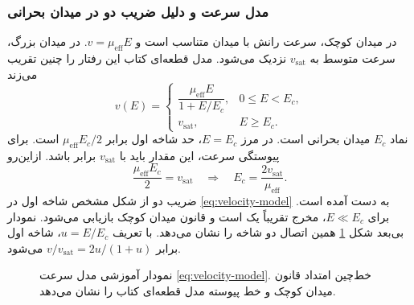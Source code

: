 \subsubsection*{مدل سرعت و دلیل ضریب دو در میدان بحرانی}
در میدان کوچک، سرعت رانش با میدان متناسب است و \(v=\mu_{\mathrm{eff}}E\).
در میدان بزرگ، سرعت متوسط به \(v_{\mathrm{sat}}\) نزدیک می‌شود. مدل قطعه‌ای
کتاب این رفتار را چنین تقریب می‌زند
\cite[روابط  و ]{weste}\cite[اسلاید ۹]{nonideal}
\begin{equation}
 v(E)=\begin{cases}
 \dfrac{\mu_{\mathrm{eff}}E}{1+E/E_c},&0\le E<E_c,\\[5pt]
 v_{\mathrm{sat}},&E\ge E_c.
 \end{cases}
 \label{eq:velocity-model}
\end{equation}
نماد \(E_c\) میدان بحرانی است. در مرز \(E=E_c\)، حد شاخه اول برابر
\(\mu_{\mathrm{eff}}E_c/2\) است. برای پیوستگی سرعت، این مقدار باید با
\(v_{\mathrm{sat}}\) برابر باشد. ازاین‌رو
\begin{equation}
 \frac{\mu_{\mathrm{eff}}E_c}{2}=v_{\mathrm{sat}}
 \quad\Longrightarrow\quad
 \boxed{E_c=\frac{2v_{\mathrm{sat}}}{\mu_{\mathrm{eff}}}}.
 \label{eq:critical-field}
\end{equation}
ضریب دو از شکل مشخص شاخه اول در \eqref{eq:velocity-model} به دست آمده است.
برای \(E\ll E_c\)، مخرج تقریباً یک است و قانون میدان کوچک بازیابی می‌شود.
نمودار بی‌بعد شکل \ref{fig:velocity-normalized} همین اتصال دو شاخه را نشان
می‌دهد. با تعریف \(u=E/E_c\)، شاخه اول برابر
\(v/v_{\mathrm{sat}}=2u/(1+u)\) می‌شود.

\begin{figure}[!htbp]
\centering
\begin{latin}
\PersianMathDigits
{}
\end{latin}
\caption{نمودار آموزشی مدل سرعت \eqref{eq:velocity-model}. خط‌چین امتداد قانون میدان کوچک و خط پیوسته مدل قطعه‌ای کتاب را نشان می‌دهد.}
\label{fig:velocity-normalized}
\end{figure}

